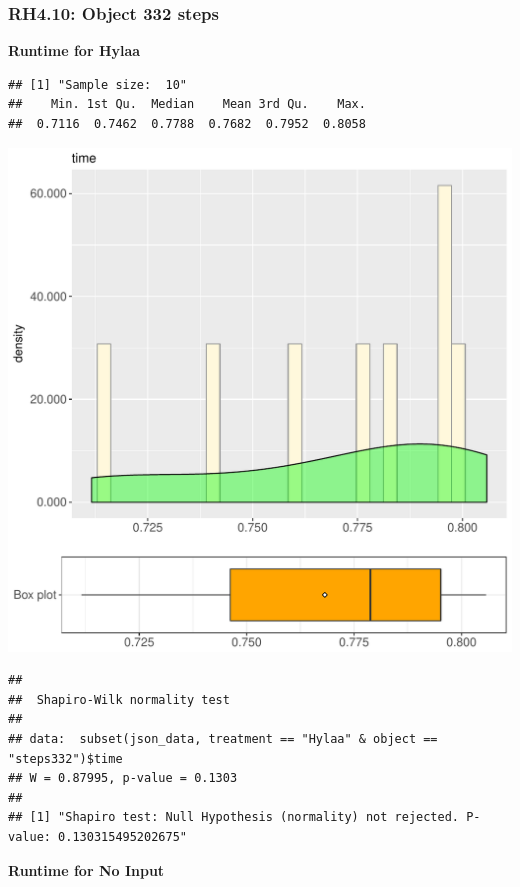 \documentclass{article}\usepackage[]{graphicx}\usepackage[]{color}
\makeatletter
\def\maxwidth{ %
  \ifdim\Gin@nat@width>\linewidth
    \linewidth
  \else
    \Gin@nat@width
  \fi
}
\newenvironment{kframe}{%
 \def\at@end@of@kframe{}%
 \ifinner\ifhmode%
  \def\at@end@of@kframe{\end{minipage}}%
  \begin{minipage}{\columnwidth}%
 \fi\fi%
 \def\FrameCommand##1{\hskip\@totalleftmargin \hskip-\fboxsep
 \colorbox{shadecolor}{##1}\hskip-\fboxsep
     \hskip-\linewidth \hskip-\@totalleftmargin \hskip\columnwidth}%
 \MakeFramed {\advance\hsize-\width
   \@totalleftmargin\z@ \linewidth\hsize
   \@setminipage}}%
 {\par\unskip\endMakeFramed%
 \at@end@of@kframe}
\newenvironment{knitrout}{}{} %
\makeatother
\begin{document}
\subsubsection{RH4.10: Object 332 steps}

 \textbf{Runtime for Hylaa}
\begin{knitrout}
\color{fgcolor}\begin{kframe}
\begin{verbatim}
## [1] "Sample size:  10"
##    Min. 1st Qu.  Median    Mean 3rd Qu.    Max. 
##  0.7116  0.7462  0.7788  0.7682  0.7952  0.8058
\end{verbatim}
\end{kframe}
\includegraphics[width=\maxwidth]{figure/RH4_Hylaa_steps332-1} 
\begin{kframe}\begin{verbatim}
## 
## 	Shapiro-Wilk normality test
## 
## data:  subset(json_data, treatment == "Hylaa" & object == "steps332")$time
## W = 0.87995, p-value = 0.1303
## 
## [1] "Shapiro test: Null Hypothesis (normality) not rejected. P-value: 0.130315495202675"
\end{verbatim}
\end{kframe}
\end{knitrout}
 \textbf{Runtime for No Input}
\end{document}
